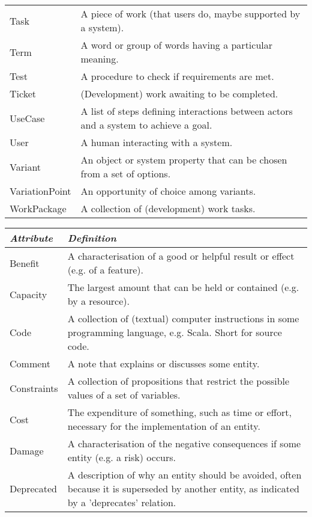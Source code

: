 \documentclass[a4paper]{llncs}
\begin{document}
\begin{minipage}{1\linewidth}
\begin{minipage}{0.36\textwidth}
\begin{table}[H]
\begin{tabular}{|l p{5.0cm}|}
Task&A piece of work (that users do, maybe supported by a system).\\
Term&A word or group of words having a particular meaning.\\
Test&A procedure to check if requirements are met.\\
Ticket&(Development) work awaiting to be completed.\\
UseCase&A list of steps defining interactions between actors and a system to achieve a goal.\\
User&A human interacting with a system.\\
Variant&An object or system property that can be chosen from a set of options.\\
VariationPoint&An opportunity of choice among variants.\\
WorkPackage&A collection of (development) work tasks.\\
\hline
 \end{tabular}
\end{table}
\end{minipage}
 \hspace{4em plus 1fill} 
\begin{minipage}{0.47\textwidth} 
 \begin{table}[H]
\fontsize{6}{6.5}\selectfont
\vspace{-0.2cm}
\label{table-entities}
\begin{tabular}{|l p{4.3cm}|}
 \hline
\textit{Attribute} & \textit{Definition}  \\ \hline
Benefit&A characterisation of a good or helpful result or effect (e.g. of a feature).\\
Capacity&The largest amount that can be held or contained (e.g. by a resource).\\
Code&A collection of (textual) computer instructions in some programming language, e.g. Scala. Short for source code.\\
Comment&A note that explains or discusses some entity.\\
Constraints&A collection of propositions that restrict the possible values of a set of variables.\\
Cost&The expenditure of something, such as time or effort, necessary for the implementation of an entity.\\
Damage&A characterisation of the negative consequences if some entity (e.g. a risk) occurs.\\
Deprecated&A description of why an entity should be avoided, often because it is superseded by another entity, as indicated by a 'deprecates' relation.\\

\end{tabular}
\end{table}
\end{minipage}
\end{minipage}
\end{document}
